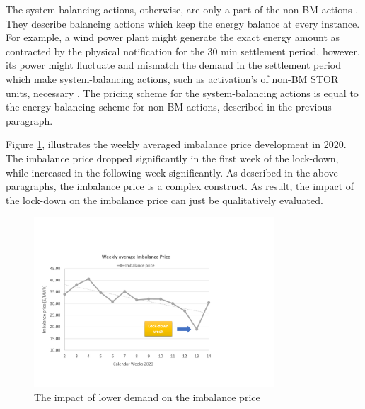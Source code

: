 \documentclass[energies,article,submit,moreauthors,pdftex]{Definitions/mdpi}
\begin{document}
The system-balancing actions, otherwise, are only a part of the non-BM actions \cite{Nationalgrid2018BalancingStatement}. They describe balancing actions which keep the energy balance at every instance. For example, a wind power plant might generate the exact energy amount as contracted by the physical notification for the 30 min settlement period, however, its power might fluctuate and mismatch the demand in the settlement period which make system-balancing actions, such as activation's of non-BM STOR units, necessary \cite{Nationalgrid2018BalancingStatement}. The pricing scheme for the system-balancing actions is equal to the energy-balancing scheme for non-BM actions, described in the previous paragraph.  

Figure \ref{fig:imbalance-price-development}, illustrates the weekly averaged imbalance price development in 2020. The imbalance price dropped significantly in the first week of the lock-down, while increased in the following week significantly. As described in the above paragraphs, the imbalance price is a complex construct. As result, the impact of the lock-down on the imbalance price can just be qualitatively evaluated.

\begin{figure}[H]
\centering
\hspace{-25pt}
\includegraphics[trim={0cm 2cm 7cm 4.5cm},clip,width=0.8\textwidth]{Graphics/Imbalance-price-development-2020.pdf}
\caption{The impact of lower demand on the imbalance price}
\label{fig:imbalance-price-development}
\end{figure} 
\end{document}
